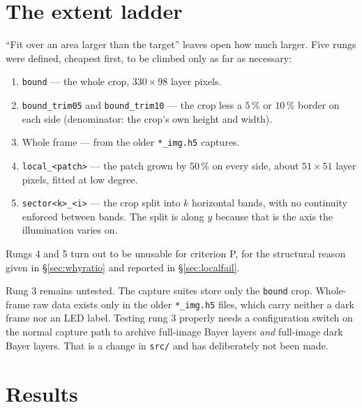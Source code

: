 \documentclass[11pt, a4paper]{article}
\newcommand{\code}[1]{\texttt{#1}}
\newcommand{\pct}{\,\%}
\begin{document}
\section{The extent ladder}
\label{sec:ladder}

``Fit over an area larger than the target'' leaves open how much larger.
Five rungs were defined, cheapest first,
to be climbed only as far as necessary:

\begin{enumerate}[nosep]
  \item \code{bound} --- the whole crop, $330\times98$ layer pixels.
  \item \code{bound\_trim05} and \code{bound\_trim10} ---
        the crop less a $5\pct$ or $10\pct$ border on each side
        (denominator: the crop's own height and width).
  \item Whole frame --- from the older \code{*\_img.h5} captures.
  \item \code{local\_<patch>} --- the patch grown by $50\pct$ on every side,
        about $51\times51$ layer pixels, fitted at low degree.
  \item \code{sector<k>\_<i>} --- the crop split into $k$ horizontal bands,
        with no continuity enforced between bands.
        The split is along $y$ because that is the axis
        the illumination varies on.
\end{enumerate}

Rungs 4 and 5 turn out to be unusable for criterion P,
for the structural reason given in \S\ref{sec:whyratio}
and reported in \S\ref{sec:localfail}.

Rung 3 remains untested.
The capture suites store only the \code{bound} crop.
Whole-frame raw data exists only in the older \code{*\_img.h5} files,
which carry neither a dark frame nor an LED label.
Testing rung 3 properly needs a configuration switch on the normal
capture path
to archive full-image Bayer layers \emph{and} full-image dark Bayer layers.
That is a change in \code{src/} and has deliberately not been made.

\section{Results}
\label{sec:results}
\end{document}
